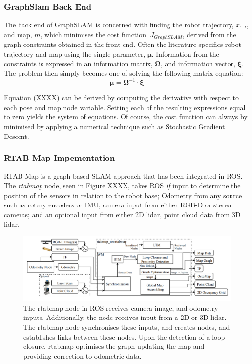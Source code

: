 \documentclass[a4paper]{article}
\begin{document}
\newpage

\subsubsection{GraphSlam Back End}
The back end of GraphSLAM is concerned with finding the robot trajectory, $x_{1:t}$, and map, $m$, which minimises the cost function, $J_{GraphSLAM}$, derived from the graph constraints obtained in the front end. Often the literature specifies robot trajectory and map using the single parameter, $\boldsymbol{\mu}$. Information from the constraints is expressed in an information matrix, $\boldsymbol{\Omega}$, and information vector, $\boldsymbol{\xi}$. The problem then simply becomes one of solving the following matrix equation:
\begin{equation}
\boldsymbol{\mu} = \boldsymbol{\Omega}^{-1} \cdot \boldsymbol{\xi}
\end{equation}

Equation (XXXX) can be derived by computing the derivative with respect to each pose and map node variable. Setting each of the resulting expressions equal to zero yields the system of equations. Of course, the cost function can always by minimised by applying a numerical technique such as Stochastic Gradient Descent.


\subsubsection{RTAB Map Impementation}
RTAB-Map is a graph-based SLAM approach that has been integrated in ROS. The \textit{rtabmap} node, seen in Figure XXXX, takes ROS \textit{tf} input to determine the position of the sensors in relation to the robot base; Odometry from any source such as rotary encoders or IMU; camera input from either RGB-D or stereo cameras; and an optional input from either 2D lidar, point cloud data from 3D lidar.
\begin{figure}[h]
\centering
\includegraphics[scale=0.3]{rtabmap_node}
\caption{The rtabmap node in ROS receives camera image, and odometry inputs. Additionally, the node receives input from a 2D or 3D lidar. The rtabmap node synchronises these inputs, and creates nodes, and establishes links between these nodes. Upon the detection of a loop closure, rtabmap optimises the graph updating the map and providing correction to odometric data.}
\end{figure}
\end{document}
